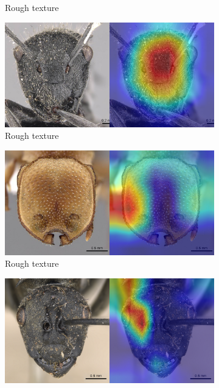 \documentclass{aci}
\numberwithin{equation}{section}
\begin{document}
\begin{figure}
\begin{subfigure}{\subwidth}
        \caption*{Rough texture}
        \label{fig:correct_ideal_842}
    \end{subfigure}
    \begin{subfigure}{\subwidth}
        \includegraphics[width=1\linewidth]{thesis_assets/gradcam/correct_ideal/1091.png}
        \caption*{Rough texture}
        \label{fig:correct_ideal_1091}
    \end{subfigure}
    \begin{subfigure}{\subwidth}
        \includegraphics[width=1\linewidth]{thesis_assets/gradcam/correct_nonideal/346.png}
        \caption*{Rough texture}
        \label{fig:correct_nonideal_346}
    \end{subfigure}
    \begin{subfigure}{\subwidth}
        \includegraphics[width=1\linewidth]{thesis_assets/gradcam/correct_nonideal/1554.png}

\end{subfigure}
\end{figure}
\end{document}
